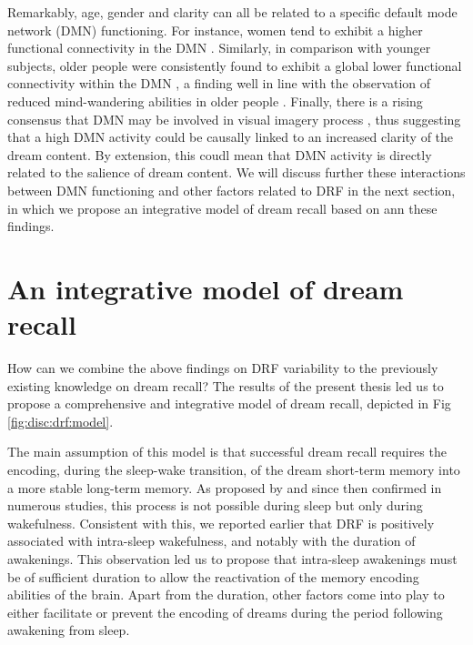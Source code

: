 Remarkably, age, gender and clarity can all be related to a specific default mode network (DMN) functioning. For instance, women tend to exhibit a higher functional connectivity in the DMN \citep{bluhm_default_2008}. Similarly, in comparison with younger subjects, older people were consistently found to exhibit a global lower functional connectivity within the DMN \citep{damoiseaux_reduced_2008, koch_effects_2010}, a finding well in line with the observation of reduced mind-wandering abilities in older people \citep{jackson_mind-wandering_2012}. Finally, there is a rising consensus that DMN may be involved in visual imagery process \citep{andrews-hanna_functional-anatomic_2010}, thus suggesting that a high DMN activity could be causally linked to an increased clarity of the dream content. By extension, this coudl mean that DMN activity is directly related to the salience of dream content. We will discuss further these interactions between DMN functioning and other factors related to DRF in the next section, in which we propose an integrative model of dream recall based on ann these findings.

\section{An integrative model of dream recall}
\label{disc:drf:model}

How can we combine the above findings on DRF variability to the previously existing knowledge on dream recall?
The results of the present thesis led us to propose a comprehensive and integrative model of dream recall, depicted in Fig \ref{fig:disc:drf:model}.

The main assumption of this model is that successful dream recall requires the encoding, during the sleep-wake transition, of the dream short-term memory into a more stable long-term memory. As proposed by \citet{koulack_dream_1976} and since then confirmed in numerous studies, this process is not possible during sleep but only during wakefulness. Consistent with this, we reported earlier that DRF is positively associated with intra-sleep wakefulness, and notably with the duration of awakenings. This observation led us to propose that intra-sleep awakenings must be of sufficient duration to allow the reactivation of the memory encoding abilities of the brain. Apart from the duration, other factors come into play to either facilitate or prevent the encoding of dreams during the period following awakening from sleep.

